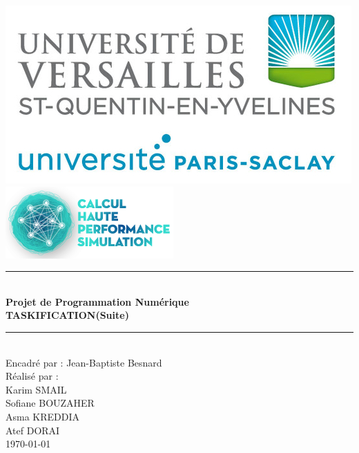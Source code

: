 \documentclass[12pt,titlepage]{article}
\begin{document}

\begin{titlepage}
\newcommand{\HRule}{\rule{\linewidth}{0.1mm}}
\center

\includegraphics[scale=0.4]{logo.png} \\[0.2cm]
\includegraphics[scale=0.7]{CHPS_logo.png} \\[0.2cm]

\HRule \\[0.4cm]
{ \huge \bfseries Projet de Programmation Numérique \\ TASKIFICATION(Suite)
  \\[0.15cm] }
\HRule \\[1.5cm]
Encadré par : Jean-Baptiste Besnard
\\Réalisé par : \\ Karim SMAIL\\ Sofiane BOUZAHER  \\ Asma  KREDDIA\\ Atef DORAI 
\\[1cm]
\today \\ [1cm]
\end{titlepage}

\end{document}
